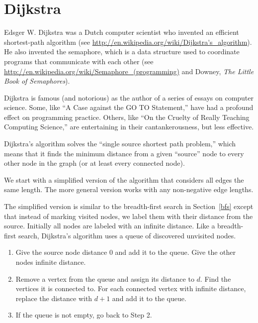 \documentclass[10pt]{book}
\begin{document}
\section{Dijkstra}

Edsger W. Dijkstra was a Dutch computer scientist who invented an
efficient shortest-path algorithm (see
\url{http://en.wikipedia.org/wiki/Dijkstra's_algorithm}).  He also invented the
semaphore, which is a data structure used to coordinate programs that
communicate with each other (see
\url{http://en.wikipedia.org/wiki/Semaphore_(programming)} and Downey, {\em The
  Little Book of Semaphores}).

Dijkstra is famous (and notorious) as the author of a series
of essays on computer science.
Some, like ``A Case against the GO TO Statement,'' have
had a profound effect on programming practice.
Others, like
``On the Cruelty of Really Teaching Computing Science,'' are
entertaining in their cantankerousness, but less effective.

Dijkstra's algorithm solves the ``single source shortest path problem,''
which means that it finds the minimum distance from a given ``source''
node to every other node in the graph (or at least every connected
node).

We start with a simplified version of the algorithm that
considers all edges the same length.  The more general version
works with any non-negative edge lengths.

The simplified version is similar to the breadth-first search
in Section~\ref{bfs} except that instead of marking visited nodes,
we label them with their distance from the source.  Initially
all nodes are labeled with an infinite distance.  Like a
breadth-first search, Dijkstra's algorithm uses a queue of
discovered unvisited nodes.

\begin{enumerate}

\item Give the source node distance 0 and add it to the queue.
Give the other nodes infinite distance.

\item Remove a vertex from the queue and assign its distance to $d$.  Find
  the vertices it is connected to.  For each connected vertex
  with infinite distance, replace the distance with $d+1$ and
  add it to the queue.

\item If the queue is not empty, go back to Step 2.

\end{enumerate}
\end{document}

